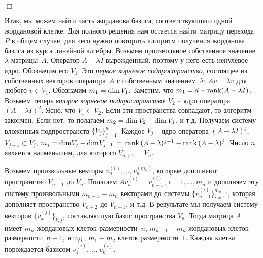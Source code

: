 \documentclass[12pt,a4paper]{article}
\begin{document}
   {\hfill $\Box$}
\medskip

 Итак, мы можем найти часть жорданова базиса, соответствующего одной жордановой клетке.
Для полного решения нам остается найти матрицу перехода~$P$ в общем случае, для чего нужно
повторить алгоритм получения жорданова базиса из курса линейной алгебры. Возьмем
произвольное собственное значение~$\lambda$ матрицы~$A$. Оператор $A - \lambda I$ вырожденный, поэтому
у него есть ненулевое ядро. Обозначим его $V_1$. Это {\em первое корневое подпространство}, состоящее из собственных
векторов оператора~$A$ с собственным значением~$\lambda$: $Av = \lambda v$ для любого $v \in V_1$.
Обозначим  $m_1 = {\rm dim}\, V_1$. Заметим, что $m_1 = d - {\rm rank} (A- \lambda I)$.
Возьмем теперь {\em второе корневое подпространство}~$V_2$ -- ядро оператора $(A - \lambda I)^2$.
Ясно, что $V_1 \subset V_2$. Если эти пространства совпадают, то алгоритм закончен.
Если нет, то полагаем $m_2 = {\rm dim}\, V_2 - {\rm dim}\, V_1$, и т.д. Получаем систему
вложенных подпространств $\{V_j\}_{j=1}^n$. Каждое $V_j$ -- ядро оператора $(A - \lambda I)^j$,
$V_{j-1} \subset V_j$,
$m_j = {\rm dim} V_j - {\rm dim} V_{j-1}  \, = \, {\rm rank} \, (A-\lambda)^{j-1} - {\rm rank} \, (A-\lambda)^{j}$.
Число $n$ является наименьшим, для которого $V_{n+1} = V_n$.

Возьмем произвольные векторы $v_n^{(1)}, \ldots , v_n^{(m_n)}$, которые
дополняют пространство $V_{n-1}$ до $V_n$. Полагаем $Av_n^{(i)} = v_{n-1}^{(i)}, \, i = 1, \ldots , m_n$ и
дополняем эту систему произвольными $m_{n-1} - m_n$ векторами до системы $\{v_{n-1}^{(i)}\}_{i=1}^{m_{n-1}}$,
которая дополняет пространство $V_{n-2}$ до $V_{n-1}$, и т.д. В результате мы получаем
систему векторов $\{v_k^{(j)}\}_{k, j}$, составляющую базис пространства $V_n$.
Тогда матрица $A$ имеет $m_n$ жордановых клеток размерности~$n$,   $m_{n-1} - m_n$
жордановых клеток размерности~$n-1$, и т.д., $m_1 - m_2$ клеток размерности~$1$.
Каждая клетка порождается  базисом $v_1^{(i)}, \ldots , v_k^{(i)}$.
\end{document}
